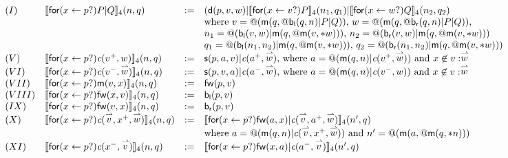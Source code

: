 \documentclass{llncs}
\makeatletter
\newcommand{\ldb}{[\![}
\newcommand{\rdb}{]\!]}
\newcommand{\binpar}[2]{#1 | #2}
\newcommand{\prefix}[3]{\mathsf{for}(#2 \leftarrow #1?) #3}
\newcommand{\quotep}[1]{\mathsf{@}#1}
\newcommand{\meaningof}[1]{\ldb #1 \rdb}
\newcommand{\vect}[1]{\stackrel{\rightharpoonup}{#1}}
\makeatother
\begin{document}
\[\begin{array}{llrl}
(I)&  \meaningof{\prefix{p}{x}{\binpar{P}{Q}}}_4(n, q) 
    & := & 
    (\mathsf{d}(p,v,w)|\binpar{\meaningof{\prefix{v}{x}{P}}_{4}(n_{1}, q_{1})}{\meaningof{\prefix{w}{x}{Q}}_{4}(n_{2}, q_{2}) } \\
    & & & \mbox{where $v = \quotep{(\mathsf{m}(q,\quotep{\binpar{\mathsf{b}_{\mathsf{l}}(q,n)}{\binpar{P}{Q}}}))}$, $w = \quotep{(\mathsf{m}(q,\quotep{\binpar{\mathsf{b}_{\mathsf{r}}(q,n)}{\binpar{P}{Q}}}))}$,} \\
    & & &\mbox{$n_{1} = \quotep{(\binpar{\mathsf{b}_{\mathsf{l}}(v,w)}{\mathsf{m}(q,\quotep{\mathsf{m}(v,*w)})})}$, $n_{2} = \quotep{(\binpar{\mathsf{b}_{\mathsf{r}}(v,w)}{\mathsf{m}(q,\quotep{\mathsf{m}(v,*w)})})}$} \\
    & & &\mbox{$q_{1} = \quotep{(\binpar{\mathsf{b}_{\mathsf{l}}(n_{1},n_{2})}{\mathsf{m}(q,\quotep{\mathsf{m}(v,*w)})})}$, $q_{2} = \quotep{(\binpar{\mathsf{b}_{\mathsf{r}}(n_{1},n_{2})}{\mathsf{m}(q,\quotep{\mathsf{m}(v,*w)})})}$} \\
(V)&  \meaningof{\prefix{p}{x}{\emph{c}(v^{+},w)}}_4(n, q) 
    & := & 
    \mathsf{s}(p,a,v)|\emph{c}(a^{+},\vect{w})
    \mbox{, where $a = @(\binpar{\mathsf{m}(q,n)}{\emph{c}(v^{+},\vect{w})})$ and $x \not\in v : \vect{w}$}\\
(VI)&  \meaningof{\prefix{p}{x}{\emph{c}(v^{-},\vect{w})}}_4(n, q) 
    & := & 
    \mathsf{s}(p,v,a)|\emph{c}(a^{-},\vect{w})
    \mbox{, where $a = @(\mathsf{m}(q,n)|\emph{c}(v^{-},w))$ and $x \not\in v : \vect{w}$} \\
(VII)&  \meaningof{\prefix{p}{x}{\mathsf{m}(v,x)}}_4(n, q) 
    & := & 
    \mathsf{fw}(p,v) \\
(VIII)&  \meaningof{\prefix{p}{x}{\mathsf{fw}(x,v)}}_4(n, q) 
    & := & 
    \mathsf{b}_{\mathsf{l}}(p,v) \\
(IX)&  \meaningof{\prefix{p}{x}{\mathsf{fw}(v,x)}}_4(n, q) 
    & := & 
    \mathsf{b}_{\mathsf{r}}(p,v) \\
(X)&  \meaningof{\prefix{p}{x}{\emph{c}(\vect{v},x^{+},\vect{w})}}_4(n, q) 
    & := & 
    \meaningof{\prefix{p}{x}{\binpar{\mathsf{fw}(a,x)}{\emph{c}(\vect{v},a^{+},\vect{w})}}}_4(n', q)\\
    & & & \mbox{where $a = @(\binpar{\mathsf{m}(q,n)}{\emph{c}(\vect{v},x^{+},\vect{w})})$} \mbox{ and $n'= \quotep{(\mathsf{m}(a,\quotep{\mathsf{m}(q,*n)}))}$} \\
(XI)&  \meaningof{\prefix{p}{x}{\emph{c}(x^{-},\vect{v})}}_4(n, q) 
    & := & 
    \meaningof{\prefix{p}{x}{\binpar{\mathsf{fw}(x,a)}{\emph{c}(a^{-},\vect{v})}}}_4(n', q)\\

\end{array}\]
\end{document}
